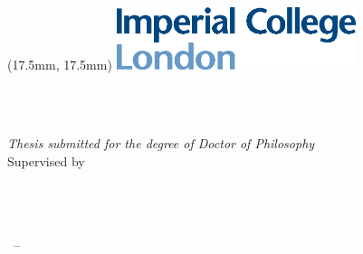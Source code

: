 \begin{titlepage}
    \begin{textblock*}{80mm}(17.5mm, 17.5mm)%
      \includegraphics[width=7cm]{gfx/imperial_logo}
    \end{textblock*} 
    \begin{center}
        \large  
        \hfill
        \vfill\vfill 

        \begingroup
            \color{Maroon}\spacedallcaps{\large{\myTitle}} \\ \bigskip
        \endgroup
        \spacedlowsmallcaps{\myName} \\ 

        \vfill\vfill

        \textit{Thesis submitted for the degree of Doctor of Philosophy} \\ 

        \vfill
        Supervised by \spacedlowsmallcaps{\myProf}\\ \medskip
        \myGroup \\
        \myDepartment \\
        \myUni \\ \bigskip

        \myTime\ -- \myVersion

    \end{center}  
\end{titlepage}   